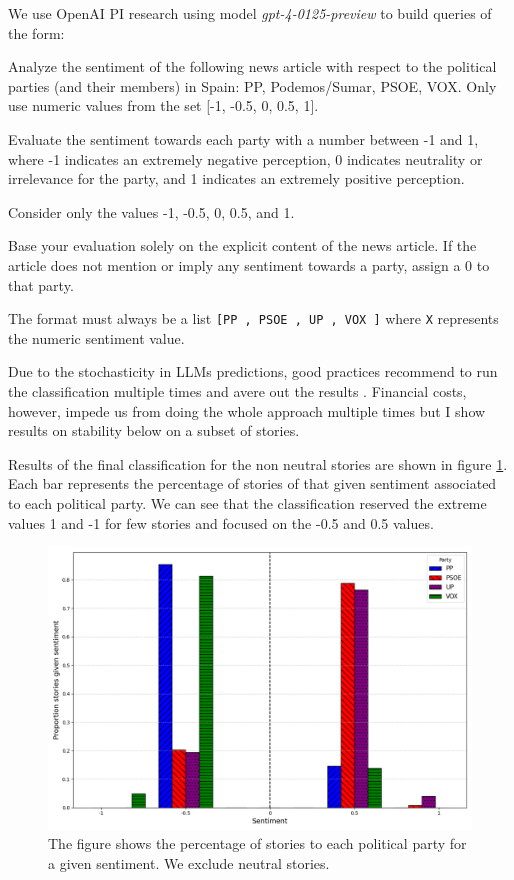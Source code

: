 \documentclass[12pt]{article}
\begin{document}
	
	
	We use OpenAI PI research  using model \textit{gpt-4-0125-preview} to build queries of the form: 
	
	
	\begin{tcolorbox}[colback=blue!5!white, colframe=blue!75!black, title=Prompt]
		Analyze the sentiment of the following news article with respect to the political parties (and their members) in Spain: PP, Podemos/Sumar, PSOE, VOX. Only use numeric values from the set [-1, -0.5, 0, 0.5, 1].
		
		Evaluate the sentiment towards each party with a number between -1 and 1, where -1 indicates an extremely negative perception, 0 indicates neutrality or irrelevance for the party, and 1 indicates an extremely positive perception.
		
		Consider only the values -1, -0.5, 0, 0.5, and 1.
		
		Base your evaluation solely on the explicit content of the news article. If the article does not mention or imply any sentiment towards a party, assign a 0 to that party.
		
		The format must always be a list \texttt{[PP
			, PSOE
			, UP
			, VOX
			]} where \texttt{X} represents the numeric sentiment value.
		
		
	\end{tcolorbox}
	
	
	Due to the stochasticity in LLMs predictions, good practices recommend to run the classification multiple times and avere out the results \citep{tornberg2023}. Financial costs, however, impede us from doing the whole approach multiple times but I show results on stability below on a subset of stories. 
	
	Results of the final classification for the non neutral stories are shown in figure \ref{fig:sent_distribution}. Each bar represents the percentage of stories of that given sentiment associated to each political party. We can see that the classification reserved the extreme values 1 and -1 for few stories and focused on the -0.5 and 0.5 values. 
	
	
	
	\begin{figure}[H]
		\centering
		\includegraphics[width=120mm]{figures/sentiment_distribution}
		\caption{The figure shows the percentage of stories to each political party for a given sentiment. We exclude neutral stories.}
		\label{fig:sent_distribution}
	\end{figure}
	
\end{document}
